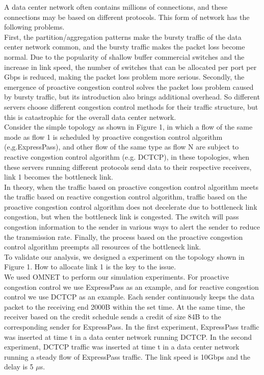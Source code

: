 \documentclass[conference]{IEEEtran}
\begin{document}
A data center network often contains millions of connections\cite{Alizadeh2010Data}, and these connections may be based on different protocols. This form of network has the following problems.\\
\indent First, the partition/aggregation patterns\cite{Alizadeh2010Data} make the bursty traffic\cite{benson2010network} of the data center network common, and the bursty traffic makes the packet loss become normal. Due to the popularity of shallow buffer commercial switches and the increase in link speed, the number of switches that can be allocated per port per Gbps is reduced, making the packet loss problem more serious. Secondly, the emergence of proactive congestion control solves the packet loss problem caused by bursty traffic, but its introduction also brings additional overhead. So different servers choose different congestion control methods for their traffic structure, but this is catastrophic for the overall data center network.\\
\indent Consider the simple topology as shown in Figure 1, in which a flow of the same mode as flow 1 is scheduled by proactive congestion control algorithm (e,g.ExpressPass\cite{cho2017credit}), and other flow of the same type as flow N are subject to reactive congestion control algorithm (e.g. DCTCP\cite{Alizadeh2010Data}), in these topologies, when these servers running different protocols send data to their respective receivers, link 1 becomes the bottleneck link.\\
\indent In theory, when the traffic based on proactive congestion control algorithm meets the traffic based on reactive congestion control algorithm, traffic based on the proactive congestion control algorithm does not decelerate due to bottleneck link congestion, but when the bottleneck link is congested.  The switch will pass congestion information to the sender in various ways to alert the sender to reduce the transmission rate. Finally, the process based on the proactive congestion control algorithm preempts all resources of the bottleneck link.\\
\indent To validate our analysis, we designed a experiment on the topology shown in Figure 1. How to allocate link 1 is the key to the issue.\\
\indent We used OMNET\cite{pongor1993omnet} to perform our simulation experiments. For proactive congestion control we use ExpressPass\cite{cho2017credit} as an example, and for reactive congestion control we use DCTCP\cite{Alizadeh2010Data} as an example. Each sender continuously keeps the data packet to the receiving end 2000B within the set time. At the same time, the receiver based on the credit schedule sends a credit of size 84B to the corresponding sender for ExpressPass. In the first experiment, ExpressPass traffic was inserted at time t in a data center network running DCTCP. In the second experiment, DCTCP traffic was inserted at time t in a data center network running a steady flow of ExpressPass traffic.     The link speed is 10Gbps and the delay is 5 $\mu$s.\\
\end{document}
